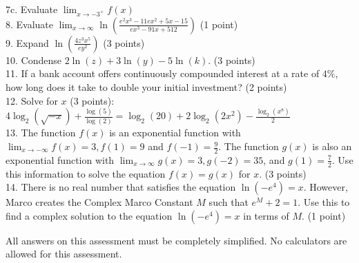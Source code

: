 \documentclass[10pt]{article}
\begin{document}
7c. Evaluate $\lim _{x \rightarrow-3^{+}} f(x)$\\
8. Evaluate $\lim _{x \rightarrow \infty} \ln \left(\frac{e^{2} x^{3}-11 e x^{2}+5 x-15}{e x^{3}-91 x+512}\right)$ (1 point)\\
9. Expand $\ln \left(\frac{4 z^{3} x^{5}}{e y^{2}}\right)$ (3 points)\\
10. Condense $2 \ln (z)+3 \ln (y)-5 \ln (k)$. (3 points)\\
11. If a bank account offers continuously compounded interest at a rate of $4 \%$, how long does it take to double your initial investment? (2 points)\\
12. Solve for $x$ (3 points): $4 \log _{2}(\sqrt{-x})+\frac{\log (5)}{\log (2)}=\log _{2}(20)+2 \log _{2}\left(2 x^{2}\right)-\frac{\log _{2}\left(x^{8}\right)}{2}$\\
13. The function $f(x)$ is an exponential function with $\lim _{x \rightarrow-\infty} f(x)=3, f(1)=9$ and $f(-1)=\frac{9}{2}$. The function $g(x)$ is also an exponential function with $\lim _{x \rightarrow \infty} g(x)=3, g(-2)=35$, and $g(1)=\frac{7}{2}$. Use this information to solve the equation $f(x)=g(x)$ for $x$. (3 points)\\
14. There is no real number that satisfies the equation $\ln \left(-e^{4}\right)=x$. However, Marco creates the Complex Marco Constant $M$ such that $e^{M}+2=1$. Use this to find a complex solution to the equation $\ln \left(-e^{4}\right)=x$ in terms of $M$. (1 point)

All answers on this assessment must be completely simplified. No calculators are allowed for this assessment.
\end{document}
